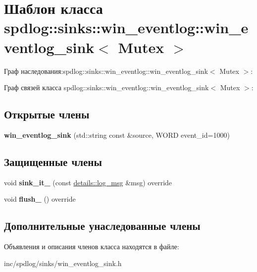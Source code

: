 \hypertarget{classspdlog_1_1sinks_1_1win__eventlog_1_1win__eventlog__sink}{}\section{Шаблон класса spdlog\+:\+:sinks\+:\+:win\+\_\+eventlog\+:\+:win\+\_\+eventlog\+\_\+sink$<$ Mutex $>$}
\label{classspdlog_1_1sinks_1_1win__eventlog_1_1win__eventlog__sink}


Граф наследования\+:spdlog\+:\+:sinks\+:\+:win\+\_\+eventlog\+:\+:win\+\_\+eventlog\+\_\+sink$<$ Mutex $>$\+:


Граф связей класса spdlog\+:\+:sinks\+:\+:win\+\_\+eventlog\+:\+:win\+\_\+eventlog\+\_\+sink$<$ Mutex $>$\+:
\subsection*{Открытые члены}
\begin{DoxyCompactItemize}
\item 
\mbox{\label{classspdlog_1_1sinks_1_1win__eventlog_1_1win__eventlog__sink_aa27bf0d3a2c753f6e7b5658ea8253bbf}} 
{\bfseries win\+\_\+eventlog\+\_\+sink} (std\+::string const \&source, W\+O\+RD event\+\_\+id=1000)
\end{DoxyCompactItemize}
\subsection*{Защищенные члены}
\begin{DoxyCompactItemize}
\item 
\mbox{\label{classspdlog_1_1sinks_1_1win__eventlog_1_1win__eventlog__sink_ac690f80c440c388f9f1f061643ea68b1}} 
void {\bfseries sink\+\_\+it\+\_\+} (const \hyperlink{structspdlog_1_1details_1_1log__msg}{details\+::log\+\_\+msg} \&msg) override
\item 
\mbox{\label{classspdlog_1_1sinks_1_1win__eventlog_1_1win__eventlog__sink_ad2d1cea17be540f41d3eee4cef6d5648}} 
void {\bfseries flush\+\_\+} () override
\end{DoxyCompactItemize}
\subsection*{Дополнительные унаследованные члены}


Объявления и описания членов класса находятся в файле\+:\begin{DoxyCompactItemize}
\item 
inc/spdlog/sinks/win\+\_\+eventlog\+\_\+sink.\+h\end{DoxyCompactItemize}
